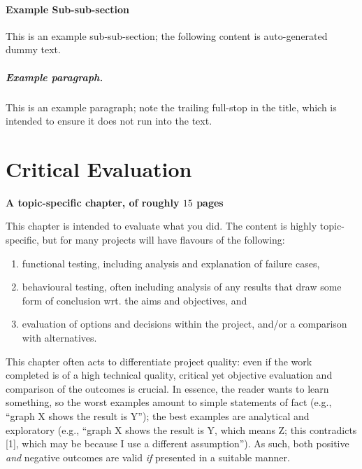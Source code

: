 \documentclass[ %
                    author={Manan Vaswani},
                supervisor={Dr. Raphael Clifford},
                    degree={MEng},
                     title={A multi-core CPU implementation \n of the classical Boson Sampling algorithm},
                  subtitle={},
                      type={},
                      year={2019} ]{dissertation}
\begin{document}
\subsubsection{Example Sub-sub-section}

This is an example sub-sub-section;
the following content is auto-generated dummy text.
\lipsum

\paragraph{Example paragraph.}

This is an example paragraph; note the trailing full-stop in the title,
which is intended to ensure it does not run into the text.


\chapter{Critical Evaluation}
\label{chap:evaluation}

{\bf A topic-specific chapter, of roughly $15$ pages} 
\vspace{1cm} 

\noindent
This chapter is intended to evaluate what you did.  The content is highly 
topic-specific, but for many projects will have flavours of the following:

\begin{enumerate}
\item functional  testing, including analysis and explanation of failure 
      cases,
\item behavioural testing, often including analysis of any results that 
      draw some form of conclusion wrt. the aims and objectives,
      and
\item evaluation of options and decisions within the project, and/or a
      comparison with alternatives.
\end{enumerate}

\noindent
This chapter often acts to differentiate project quality: even if the work
completed is of a high technical quality, critical yet objective evaluation 
and comparison of the outcomes is crucial.  In essence, the reader wants to
learn something, so the worst examples amount to simple statements of fact 
(e.g., ``graph X shows the result is Y''); the best examples are analytical 
and exploratory (e.g., ``graph X shows the result is Y, which means Z; this 
contradicts [1], which may be because I use a different assumption'').  As 
such, both positive {\em and} negative outcomes are valid {\em if} presented 
in a suitable manner.
\end{document}
